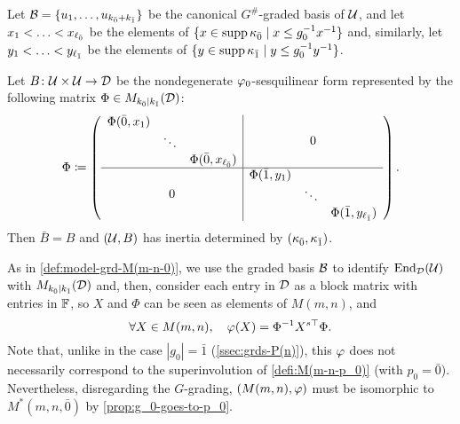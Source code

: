 Let $\mathcal B = \{u_1, \ldots, u_{k_{\bar{0}} + k_{\bar{1}}} \}$ be the canonical $G^\#$-graded basis of $\mathcal U$, and 
let $x_1 < \ldots < x_{\ell_{\bar{0}}}$ be the elements of $\{ x \in \operatorname{supp} \kappa_{\bar{0}} \mid x \leq g_0^{-1} x^{-1} \}$ and, similarly, let $y_1 < \ldots < y_{\ell_{\bar{1}}}$ be the elements of $\{ y \in \operatorname{supp} \kappa_{\bar{1}} \mid y \leq g_0^{-1} y^{-1} \}$. 

Let $B\colon \mathcal U\times \mathcal U \to \mathcal{D}$ be the nondegenerate $\varphi_0$-sesquilinear form represented by the following matrix $\Phi \in M_{k_{\bar{0}} \mid k_{\bar{1}}} (\mathcal{D})$:
\[\label{eq:puting-the-blocks-of-Phi-together}
    \sbox0{$\begin{matrix}
        \Phi(\bar 0, x_1)&& \\
        & \ddots &\\
        && \Phi(\bar 0, x_{\ell_\bz})
    \end{matrix}$}
    \sbox1{$\begin{matrix}
        \Phi(\bar 1, y_1)&& \\
        & \ddots &\\
        && \Phi(\bar 1, y_{\ell_\bo})
    \end{matrix}$}
    \Phi \coloneqq
    \left(\begin{array}{c|c}
            \usebox{0} & 0\\
            \hline
            0 & \usebox{1}
        \end{array}\right).
\]
%
Then $\bar B = B$ and $(\mathcal U, B)$ has inertia determined by $(\kappa_{\bar{0}}, \kappa_{\bar{1}})$. 

As in \cref{def:model-grd-M(m-n-0)}, we use the graded basis $\mathcal B$ to identify $\operatorname{End}_{\mathcal{D}}(\mathcal U)$ with $M_{k_{\bar{0}}|k_{\bar{1}}}(\mathcal{D})$ and, then, consider each entry in $\mathcal{D}$ as a block matrix with entries in $\mathbb{F}$, so $X$ and $\Phi$ can be seen as elements of $M(m,n)$, and
\[\label{eq:Phi-for-graded-osp}
    \forall X\in M(m,n), \quad \varphi(X) = \Phi^{-1} X^{s\top} \Phi.
\]
Note that, unlike in the case $|g_0| = \bar 1$ (\cref{ssec:grds-P(n)}), this $\varphi$ does not necessarily correspond to the superinvolution of \cref{defi:M(m-n-p_0)} (with $p_0 = \bar 0$). 
Nevertheless, disregarding the $G$-grading, $(M(m,n), \varphi)$ must be isomorphic to $M^*(m,n, \bar 0)$ by \cref{prop:g_0-goes-to-p_0}.

